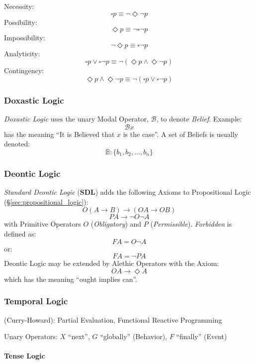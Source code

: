 Necessity:
\[
  \square p \equiv \neg \Diamond \neg p
\]
Possibility:
\[
  \Diamond p \equiv \neg \square \neg p
\]
Impossibility:
\[
  \neg \Diamond p \equiv \square \neg p
\]
Analyticity:
\[
  \square p \vee \square \neg p
  \equiv \neg (\Diamond p \wedge \Diamond \neg p)
\]
Contingency:
\[
  \Diamond p \wedge \Diamond \neg p
  \equiv \neg (\square p \vee \square \neg p)
\]



\subsubsection{Doxastic Logic}\label{sec:doxastic_logic}

\emph{Doxastic Logic} uses the unary Modal Operator, $\mathcal{B}$, to
denote \emph{Belief}. Example:
\[
  \mathcal{B} x
\]
has the meaning ``It is Believed that $x$ is the case''. A set of
Beliefs is usually denoted:
\[
  \mathbb{B}: \{ b_1, b_2, \ldots, b_n \}
\]



\subsubsection{Deontic Logic}\label{sec:deontic_logic}

\emph{Standard Deontic Logic} ($\mathbf{SDL}$) adds the following
Axioms to Propositional Logic (\S\ref{sec:propositional_logic}):
\[
  O(A \rightarrow B) \rightarrow (OA \rightarrow OB)
\]
\[
  PA \rightarrow \neg O \neg A
\]
with Primitive Operators $O$ (\emph{Obligatory}) and $P$
(\emph{Permissible}). \emph{Forbidden} is defined as:
\[
  FA = O \neg A
\]
or:
\[
  FA = \neg P A
\]
Deontic Logic may be extended by Alethic Operators with the Axiom:
\[
  OA \rightarrow \Diamond A
\]
which has the meaning ``ought implies can''.



\subsubsection{Temporal Logic}\label{sec:temporal_logic}

(Curry-Howard): Partial Evaluation, Functional Reactive Programming

Unary Operators: $X$ ``next'', $G$ ``globally'' (Behavior), $F$
``finally'' (Event)



\paragraph{Tense Logic}\label{sec:tense_logic}
\hfill \\

